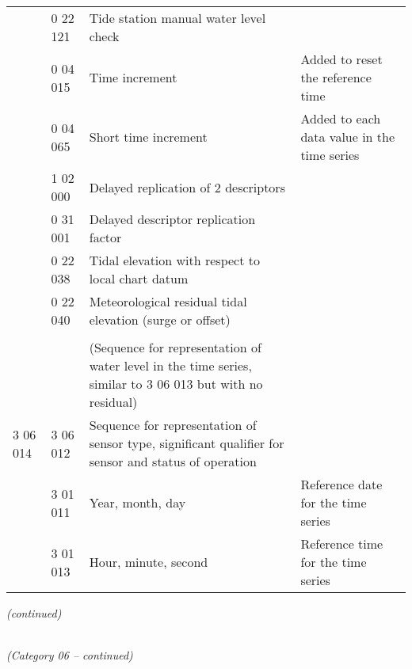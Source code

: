 \begin{longtable}[]{@{}llll@{}}
& 0 22 121 & Tide station manual water level check &\tabularnewline
& 0 04 015 & Time increment & Added to reset the reference time\tabularnewline
& 0 04 065 & Short time increment & Added to each data value in the time series\tabularnewline
& 1 02 000 & Delayed replication of 2 descriptors &\tabularnewline
& 0 31 001 & Delayed descriptor replication factor &\tabularnewline
& 0 22 038 & Tidal elevation with respect to local chart datum &\tabularnewline
& 0 22 040 & Meteorological residual tidal elevation (surge or offset) &\tabularnewline
& & &\tabularnewline
& & (Sequence for representation of water level in the time series, similar to 3 06 013 but with no residual) &\tabularnewline
3 06 014 & 3 06 012 & Sequence for representation of sensor type, significant qualifier for sensor and status of operation &\tabularnewline
& 3 01 011 & Year, month, day & Reference date for the time series\tabularnewline
& 3 01 013 & Hour, minute, second & Reference time for the time series\tabularnewline
\bottomrule
\end{longtable}

\emph{(continued)}

\emph{\\
(Category 06 -- continued)}

